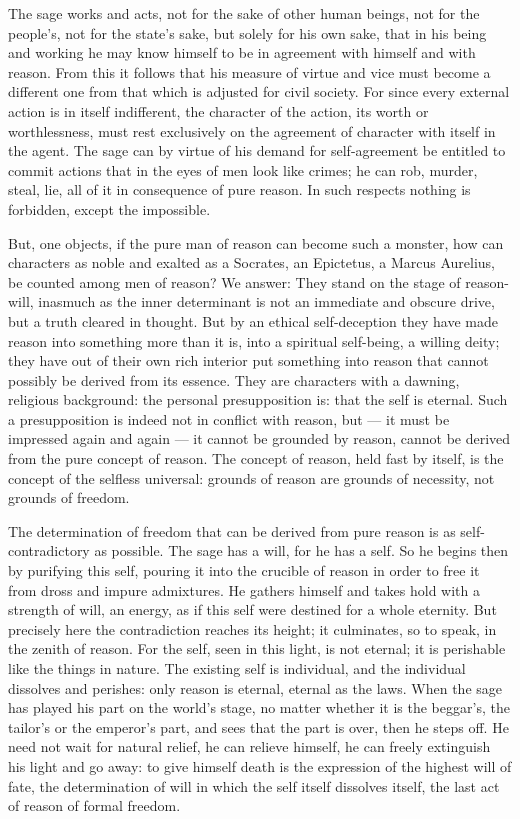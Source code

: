 \documentclass[12pt,a4paper,openany]{book}
\newcommand{\opage}[1]{\marginnote{\footnotesize\textit{[#1]}}}
\begin{document}
The sage works and acts, not for the sake of other human beings, not for the people's, not for the state's sake, but solely
for his own sake, that in his being and working he may know himself to be in agreement with himself and with reason. From
this it follows that his measure of virtue and vice must become a different one from that which is adjusted for civil
society. For since every external action is in itself indifferent, the character of the action, its worth or worthlessness,
must rest exclusively on the agreement of character with itself in the agent. The sage can by virtue of his demand for
self-agreement be entitled to commit actions that in the eyes of men look like crimes; he can rob, murder, steal, lie, all
of it in consequence of pure reason. In such respects nothing is forbidden, except the impossible.

But, one objects, if the pure man of reason can become such a monster, how can characters as noble and exalted as a Socrates,
an Epictetus, a Marcus Aurelius, be counted among men of reason?
\setcounter{footnote}{0}%
\opage{31}We answer: They stand on the stage of reason-will, inasmuch as the inner determinant is not an immediate and obscure
drive, but a truth cleared in thought. But by an ethical self-deception they have made reason into something more than it is,
into a spiritual self-being, a willing deity; they have out of their own rich interior put something into reason that
cannot possibly be derived from its essence. They are characters with a dawning, religious background: the personal
presupposition is: that the self is eternal. Such a presupposition is indeed not in conflict with reason, but
--- it must be impressed again and again --- it cannot be grounded by reason, cannot be derived from the pure concept of
reason. The concept of reason, held fast by itself, is the concept of the selfless universal: grounds of reason are grounds
of necessity, not grounds of freedom.

The determination of freedom that can be derived from pure reason is as self-contradictory as possible. The sage has a will,
for he has a self. So he begins then by purifying this self, pouring it into the crucible of reason in order to free it from
dross and impure admixtures. He gathers himself and takes hold with a strength of will, an energy, as if this self were
destined for a whole eternity. But precisely here the contradiction reaches its height; it culminates, so to speak, in the
zenith of reason. For the self, seen in this light, is not eternal; it is perishable like the things in nature. The existing
self is individual, and the individual dissolves and perishes: only reason is eternal, eternal as the laws. When the sage has
played his part on the world's stage, no matter whether it is the beggar's, the tailor's or the emperor's part, and sees that
the part is over, then he steps off. He need not wait for natural relief, he can relieve himself, he can freely extinguish
his light and go away: to give himself death is the expression of the highest will of fate, the determination of will in
which the self itself dissolves itself, the last act of reason of formal freedom.
\end{document}
